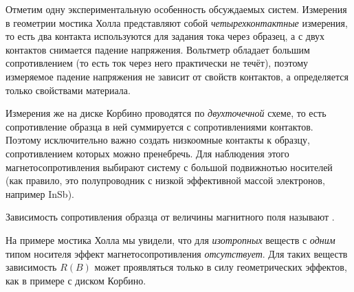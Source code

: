 \begin{lab:note}
Отметим одну экспериментальную особенность обсуждаемых систем. Измерения в
геометрии мостика Холла представляют собой \emph{четырехконтактные}
измерения, то есть два контакта используются для задания тока через образец, а с
двух контактов снимается падение напряжения. Вольтметр обладает
большим сопротивлением (то есть ток через него практически не
течёт), поэтому измеряемое падение напряжения не зависит от свойств
контактов, а определяется только свойствами материала.

Измерения же на диске Корбино проводятся по \emph{двухточечной}
схеме, то есть сопротивление образца в ней суммируется с сопротивлениями
контактов. Поэтому исключительно важно создать низкоомные контакты к образцу,
сопротивлением которых можно пренебречь. Для наблюдения этого
магнетосопротивления выбирают систему с большой подвижнотью носителей
(как правило, это полупроводник с низкой эффективной массой электронов,
например InSb).
\end{lab:note}


Зависимость сопротивления образца от величины магнитного поля называют
.

На примере мостика Холла мы увидели, что для \emph{изотропных} веществ с
\emph{одним} типом носителя эффект магнетосопротивления
\emph{отсутствует}. Для таких веществ зависимость $R(B)$ может проявляться
только в силу геометрических эффектов, как в примере с диском Корбино.

